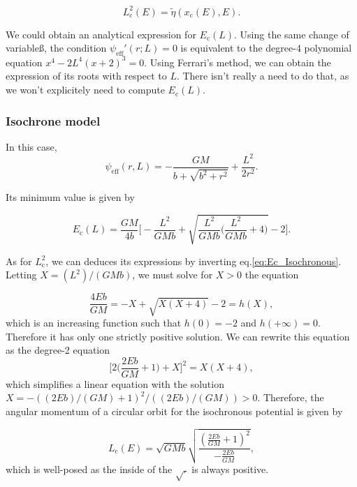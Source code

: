 \documentclass[11pt]{article}
\newcommand{\rc}{\mathrm{c}}
\newcommand{\psieff}{\psi_{\mathrm{eff}}}
\newcommand{\Ec}{E_{\rc}}
\newcommand{\Lc}{L_{\rc}}
\newcommand{\xc}{x_{\rc}}
\begin{document}
\begin{equation}
  \Lc^{2}(E) =\tilde{\eta}(\xc(E),E)  .
  \label{eq:Lc_analytical_Plummer}
  \end{equation}

We could obtain an analytical expression for $\Ec(L)$. Using the same change of variableß, the condition $\psieff'(r;L)=0$ is equivalent to the degree-4 polynomial equation $x^{4}-2L^{4}(x+2)^{3}=0$. Using Ferrari's method, we can obtain the expression of its roots with respect to $L$. There isn't really a need to do that, as we won't explicitely need to compute $\Ec(L)$.

\subsubsection{Isochrone model}
\label{subsubsec:IsoCircularOrbit}

In this case, 
$$\psieff(r,L)=-\frac{GM}{b+\sqrt{b^{2}+r^{2}}} + \frac{L^{2}}{2r^{2}} .$$

Its minimum value is given by

\begin{equation}
  \Ec(L) = \frac{GM}{4b} \bigg[-\frac{L^{2}}{GMb} + \sqrt{\frac{L^{2}}{GMb} \bigg(\frac{L^{2}}{GMb} +4\bigg)}-2\bigg].
  \label{eq:Ec_Isochronous}
\end{equation}

As for $\Lc^{2}$, we can deduces its expressions by inverting eq.\eqref{eq:Ec_Isochronous}. Letting $X=(L^{2})/(GMb) $, we must solve for $X>0$ the equation

\begin{equation}
  \frac{4Eb}{GM} =-X+\sqrt{X(X+4)}-2= h(X) ,
  \label{eq:Lc2X}
\end{equation}
which is an increasing function such that $h(0)=-2$ and $h(+\infty)=0$. Therefore it has only one strictly positive solution. We can rewrite this equation as the degree-2 equation
\begin{equation}
  \bigg[2\bigg(\frac{2Eb}{GM}+1\bigg)+X\bigg]^{2}=X(X+4) ,
  \label{eq:Lc2X_poly2_equation}
\end{equation}
which simplifies a linear equation with the solution $X=-((2Eb)/(GM)+1)^{2}/((2Eb)/(GM))>0$. Therefore, the angular momentum of a circular orbit for the isochronous potential is given by

\begin{equation}
  \Lc(E) = \sqrt{GMb}\sqrt{\frac{(\frac{2Eb}{GM}+1)^{2}}{-\frac{2Eb}{GM}}} ,
  \label{eq:Ec_Iso}
  \end{equation}
  which is well-posed as the inside of the $\sqrt{.}$ is always positive.
\end{document}
